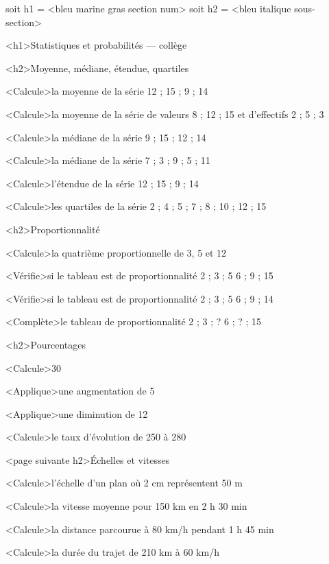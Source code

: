 \documentclass[marges=20, taille=11, precision=3]{texecole}
\begin{document}
soit h1 = <bleu marine gras section num>
soit h2 = <bleu italique sous-section>

<h1>Statistiques et probabilités — collège

<h2>Moyenne, médiane, étendue, quartiles

<Calcule>la moyenne de la série 12 ; 15 ; 9 ; 14

<Calcule>la moyenne de la série de valeurs 8 ; 12 ; 15 et d'effectifs 2 ; 5 ; 3

<Calcule>la médiane de la série 9 ; 15 ; 12 ; 14

<Calcule>la médiane de la série 7 ; 3 ; 9 ; 5 ; 11

<Calcule>l'étendue de la série 12 ; 15 ; 9 ; 14

<Calcule>les quartiles de la série 2 ; 4 ; 5 ; 7 ; 8 ; 10 ; 12 ; 15

<h2>Proportionnalité

<Calcule>la quatrième proportionnelle de 3, 5 et 12

<Vérifie>si le tableau est de proportionnalité {
	2 ; 3 ; 5
	6 ; 9 ; 15
}

<Vérifie>si le tableau est de proportionnalité {
	2 ; 3 ; 5
	6 ; 9 ; 14
}

<Complète>le tableau de proportionnalité {
	2 ; 3 ; ?
	6 ; ? ; 15
}

<h2>Pourcentages

<Calcule>30 %

<Applique>une augmentation de 5 %

<Applique>une diminution de 12 %

<Calcule>le taux d'évolution de 250 à 280

<page suivante h2>Échelles et vitesses

<Calcule>l'échelle d'un plan où 2 cm représentent 50 m

<Calcule>la vitesse moyenne pour 150 km en 2 h 30 min

<Calcule>la distance parcourue à 80 km/h pendant 1 h 45 min

<Calcule>la durée du trajet de 210 km à 60 km/h
\end{document}
